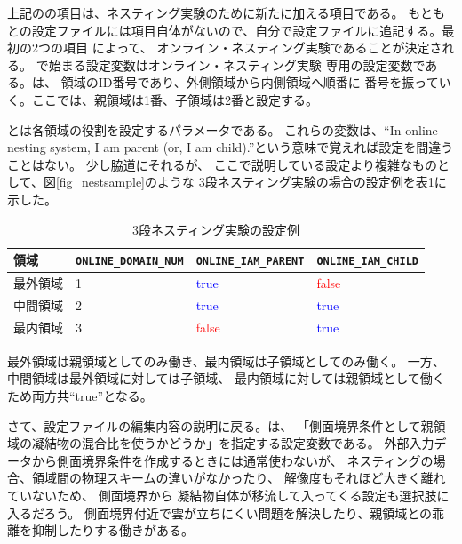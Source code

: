 \noindent 上記のの項目は、ネスティング実験のために新たに加える項目である。
もともとの設定ファイルには項目自体がないので、自分で設定ファイルに追記する。最初の2つの項目
によって、
オンライン・ネスティング実験であることが決定される。
で始まる設定変数はオンライン・ネスティング実験
専用の設定変数である。は、
領域のID番号であり、外側領域から内側領域へ順番に
番号を振っていく。ここでは、親領域は1番、子領域は2番と設定する。

とは各領域の役割を設定するパラメータである。
これらの変数は、``In online nesting system, I am parent (or, I am child).''という意味で覚えれば設定を間違うことはない。
少し脇道にそれるが、
ここで説明している設定より複雑なものとして、図\ref{fig_nestsample}のような
3段ネスティング実験の場合の設定例を表\ref{tab:triple_nested}に示した。

\begin{table}[htb]
\begin{center}
\caption{3段ネスティング実験の設定例}
\begin{tabularx}{150mm}{|l|l|l|X|} \hline
 \rowcolor[gray]{0.9} 領域 & \verb|ONLINE_DOMAIN_NUM| & \verb|ONLINE_IAM_PARENT| & \verb|ONLINE_IAM_CHILD|\\ \hline
 最外領域 & 1 & \textcolor{blue}{true} & \textcolor{red}{false} \\ \hline
 中間領域 & 2 & \textcolor{blue}{true} & \textcolor{blue}{true} \\ \hline
 最内領域 & 3 & \textcolor{red}{false} & \textcolor{blue}{true} \\ \hline
\end{tabularx}
\label{tab:triple_nested}
\end{center}
\end{table}

\noindent 最外領域は親領域としてのみ働き、最内領域は子領域としてのみ働く。
一方、中間領域は最外領域に対しては子領域、
最内領域に対しては親領域として働くため両方共``true''となる。

さて、設定ファイルの編集内容の説明に戻る。は、
「側面境界条件として親領域の凝結物の混合比を使うかどうか」を指定する設定変数である。
外部入力データから側面境界条件を作成するときには通常使わないが、
ネスティングの場合、領域間の物理スキームの違いがなかったり、
解像度もそれほど大きく離れていないため、
側面境界から
凝結物自体が移流して入ってくる設定も選択肢に入るだろう。
側面境界付近で雲が立ちにくい問題を解決したり、親領域との乖離を抑制したりする働きがある。

